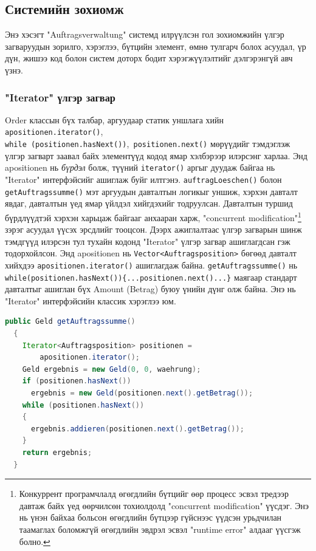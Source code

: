 \subsection{Системийн зохиомж}
Энэ хэсэгт "Auftragsverwaltung" системд илрүүлсэн гол зохиомжийн үлгэр загваруудын зорилго, хэрэглээ, бүтцийн элемент, өмнө тулгарч болох асуудал, үр дүн, жишээ код болон систем доторх бодит хэрэгжүүлэлтийг дэлгэрэнгүй авч үзнэ.

\subsubsection{"Iterator" үлгэр загвар}
Order классын бүх талбар, аргуудаар статик уншлага хийн \verb|apositionen.iterator()|,\\ \verb|while (positionen.hasNext())|,\verb| positionen.next()| мөрүүдийг тэмдэглэж үлгэр загварт заавал байх элементүүд кодод ямар хэлбэрээр илэрсэнг харлаа. Энд apositionen нь \textit{бүрдэл} болж, түүний \verb|iterator()| аргыг дуудаж байгаа нь "Iterator" интерфэйсийг ашиглаж буйг илтгэнэ. \verb|auftragLoeschen()| болон \verb|getAuftragssumme()| мэт аргуудын давталтын логикыг уншиж, хэрхэн давталт явдаг, давталтын үед ямар үйлдэл хийгдэхийг тодруулсан. Давталтын туршид бүрдлүүдтэй хэрхэн харьцаж байгааг анхааран харж, "concurrent modification"\footnote{Конкуррент програмчлалд өгөгдлийн бүтцийг өөр процесс эсвэл тредээр давтаж байх үед өөрчилсөн тохиолдолд "concurrent modification" үүсдэг. Энэ нь үнэн байхаа больсон өгөгдлийн бүтцээр гүйснээс үүдсэн урьдчилан таамаглах боломжгүй өгөгдлийн эвдрэл эсвэл "runtime error" алдааг үүсгэж болно.} зэрэг асуудал үүсэх эрсдлийг тооцсон. Дээрх ажиглалтаас үлгэр загварын шинж тэмдгүүд илэрсэн тул тухайн кодонд "Iterator" үлгэр загвар ашиглагдсан гэж тодорхойлсон. Энд apositionen нь \verb|Vector<Auftragsposition>| бөгөөд давталт хийхдээ \verb|apositionen.iterator()| ашиглагдаж байна. \verb|getAuftragssumme()| нь \verb|while(positionen.hasNext()){...positionen.next()...}| маягаар стандарт давталтыг ашиглан бүх Amount (Betrag) буюу үнийн дүнг олж байна. Энэ нь "Iterator" интерфэйсийн классик хэрэглээ юм.

\begin{lstlisting}[language=Java, caption=Order классын арга getAuftragssumme, frame=single]
  public Geld getAuftragssumme()
  {
    Iterator<Auftragsposition> positionen =
        apositionen.iterator();
    Geld ergebnis = new Geld(0, 0, waehrung);
    if (positionen.hasNext())
      ergebnis = new Geld(positionen.next().getBetrag());
    while (positionen.hasNext())
    {
      ergebnis.addieren(positionen.next().getBetrag());
    }
    return ergebnis;
  }
\end{lstlisting}

